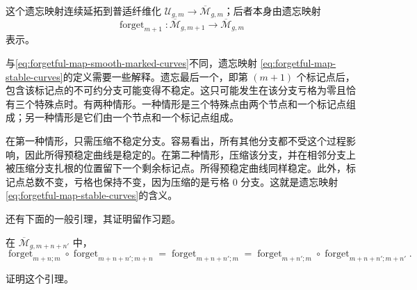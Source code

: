 这个遗忘映射连续延拓到普适纤维化
$\mathcal U_{g,m}\to\overline{\mathcal M}_{g,m}$；后者本身由遗忘映射
\begin{equation}
 \operatorname{forget}_{m+1}:
 \overline{\mathcal M}_{g,m+1}\longrightarrow
 \overline{\mathcal M}_{g,m}
 \label{eq:forgetful-map-stable-curves}
\end{equation}
表示。

\begin{remark}\label{rem:stabilization-after-forgetting-mark}
与\eqref{eq:forgetful-map-smooth-marked-curves}不同，遗忘映射
\eqref{eq:forgetful-map-stable-curves}的定义需要一些解释。遗忘最后一个，即第 $(m+1)$ 个标记点后，包含该标记点的不可约分支可能变得不稳定。这只可能发生在该分支亏格为零且恰有三个特殊点时。有两种情形。一种情形是三个特殊点由两个节点和一个标记点组成；另一种情形是它们由一个节点和一个标记点组成。

在第一种情形，只需压缩不稳定分支。容易看出，所有其他分支都不受这个过程影响，因此所得预稳定曲线是稳定的。在第二种情形，压缩该分支，并在相邻分支上被压缩分支扎根的位置留下一个剩余标记点。所得预稳定曲线同样稳定。此外，标记点总数不变，亏格也保持不变，因为压缩的是亏格 $0$ 分支。这就是遗忘映射\eqref{eq:forgetful-map-stable-curves}的含义。
\end{remark}

还有下面的一般引理，其证明留作习题。

\begin{lemma}\label{lem:forgetful-map-compositions}
在 $\overline{\mathcal M}_{g,m+n+n'}$ 中，
\[
 \operatorname{forget}_{m+n;m}\circ
 \operatorname{forget}_{m+n+n';m+n}
 =\operatorname{forget}_{m+n+n';m}
 =\operatorname{forget}_{m+n';m}\circ
 \operatorname{forget}_{m+n+n';m+n'}.
\]
\end{lemma}

\begin{exercise}\label{ex:forgetful-map-compositions}
证明这个引理。
\end{exercise}
